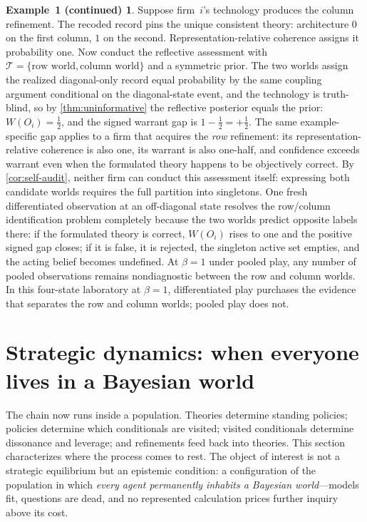 \documentclass[11pt]{article}
\theoremstyle{definition}
\newtheorem*{excont}{Example~1 (continued)}
\begin{document}
\begin{excont}
Suppose firm~$i$'s technology produces the column refinement.
The recoded record pins the unique consistent theory: architecture $0$ on the first column, $1$ on the second.
Representation-relative coherence assigns it probability one.
Now conduct the reflective assessment with $\mathcal T=\{\text{row world},\text{column world}\}$ and a symmetric prior.
The two worlds assign the realized diagonal-only record equal probability by the same coupling argument conditional on the diagonal-state event, and the technology is truth-blind, so by \cref{thm:uninformative} the reflective posterior equals the prior: $W(O_i)=\tfrac12$, and the signed warrant gap is $1-\tfrac12=+\tfrac12$.
The same example-specific gap applies to a firm that acquires the \emph{row} refinement: its representation-relative coherence is also one, its warrant is also one-half, and confidence exceeds warrant even when the formulated theory happens to be objectively correct.
By \cref{cor:self-audit}, neither firm can conduct this assessment itself: expressing both candidate worlds requires the full partition into singletons.
One fresh differentiated observation at an off-diagonal state resolves the row/column identification problem completely because the two worlds predict opposite labels there: if the formulated theory is correct, $W(O_i)$ rises to one and the positive signed gap closes; if it is false, it is rejected, the singleton active set empties, and the acting belief becomes undefined.
At $\beta=1$ under pooled play, any number of pooled observations remains nondiagnostic between the row and column worlds.
In this four-state laboratory at $\beta=1$, differentiated play purchases the evidence that separates the row and column worlds; pooled play does not.
\end{excont}
\section{Strategic dynamics: when everyone lives in a Bayesian world}
\label{sec:dynamics}

The chain now runs inside a population.
Theories determine standing policies; policies determine which conditionals are visited; visited conditionals determine dissonance and leverage; and refinements feed back into theories.
This section characterizes where the process comes to rest.
The object of interest is not a strategic equilibrium but an epistemic condition: a configuration of the population in which \emph{every agent permanently inhabits a Bayesian world}---models fit, questions are dead, and no represented calculation prices further inquiry above its cost.
\end{document}
